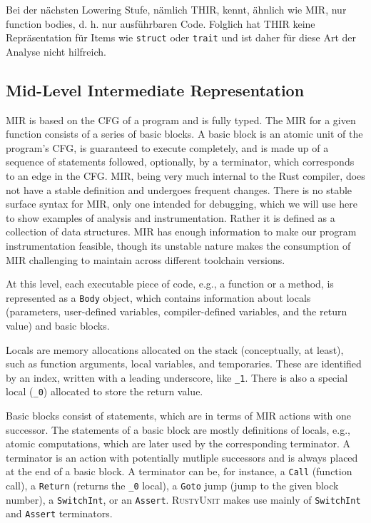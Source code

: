 \documentclass[paper=a4,%
  twoside,%
  BCOR4mm,%
  abstract=true,%
  toc=bibliography,%
  chapterprefix=true,%
  toc=bibliographynumbered,%
  open=right,%
  english,%
  pagesize=pdftex]{scrreprt}
\begin{document}
Bei der nächsten Lowering Stufe, nämlich \ac{THIR}, kennt, ähnlich wie \ac{MIR}, nur function bodies, d. h. nur ausführbaren Code. Folglich hat \ac{THIR} keine Repräsentation für Items wie \lstinline{struct} oder
\lstinline{trait} und ist daher für diese Art der Analyse nicht hilfreich.

\subsection{Mid-Level Intermediate Representation}
\ac{MIR} is based on the \ac{CFG} of a program and is fully typed. The \ac{MIR} for a given function consists of a series of basic blocks. A basic block is an atomic unit of the program's \ac{CFG}, is guaranteed to execute completely, and is made up of a sequence of statements followed, optionally, by a terminator, which corresponds to an edge in the \ac{CFG}. \ac{MIR}, being very much internal to the Rust compiler, does not have a stable definition and undergoes frequent changes. There is no stable surface syntax for \ac{MIR}, only one intended for debugging, which we will use here to show examples of analysis and instrumentation. Rather it is defined as a collection of data structures. \ac{MIR} has enough information to make our program instrumentation feasible, though its unstable nature makes the consumption of \ac{MIR} challenging to maintain across different toolchain versions.

At this level, each executable piece of code, e.g., a function or a method, is represented as a \lstinline{Body} object, which contains information about locals (parameters, user-defined variables, compiler-defined variables, and the return value) and basic blocks.

Locals are memory allocations allocated on the stack (conceptually, at least), such as function arguments, local variables, and temporaries. These are identified by an index, written with a leading underscore, like \lstinline{_1}. There is also a special local (\lstinline{_0}) allocated to store the return value. 

Basic blocks consist of statements, which are in terms of \ac{MIR} actions with one successor. The statements of a basic block are mostly definitions of locals, e.g., atomic computations, which are later used by the corresponding terminator. A terminator is an action with potentially mutliple successors and is always placed at the end of a basic block. A terminator can be, for instance, a \lstinline{Call} (function call), a \lstinline{Return} (returns the \lstinline{_0} local), a \lstinline{Goto} jump (jump to the given block number), a \lstinline{SwitchInt}, or an \lstinline{Assert}. \textsc{RustyUnit} makes use mainly of \lstinline{SwitchInt} and \lstinline{Assert} terminators. 
\end{document}
